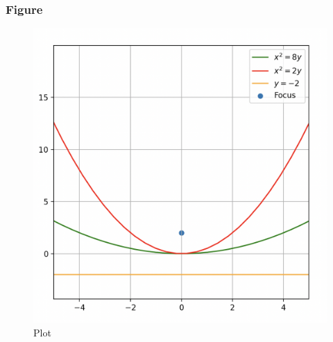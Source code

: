 \documentclass{beamer}
\begin{document}
\begin{frame}[fragile]
    \frametitle{Figure}
\begin{figure}[H]
    \centering
    \includegraphics[width=0.6\columnwidth]{Figs/847.png}
    \caption{Plot}
    \label{fig:placeholder}
\end{figure}
\end{frame}
\end{document}
